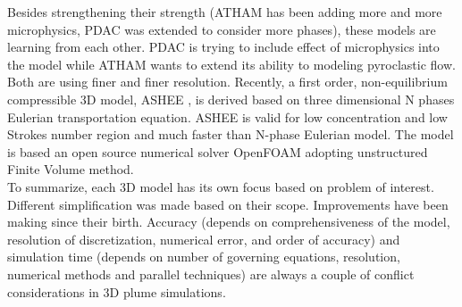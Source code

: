 \documentclass[journal abbreviation, manuscript]{copernicus}
\begin{document}
Besides strengthening their strength (ATHAM has been adding more and more microphysics, PDAC was extended to consider more phases), these models are learning from each other. PDAC is trying to include effect of microphysics into the model while ATHAM wants to extend its ability to modeling pyroclastic flow. Both are using finer and finer resolution. Recently, a first order, non-equilibrium compressible 3D model, ASHEE \citep{cerminara2016ashee}, is derived based on three dimensional N phases Eulerian transportation equation. ASHEE is valid for low concentration and low Strokes number region and much faster than N-phase Eulerian model. The model is based an open source numerical solver OpenFOAM adopting unstructured Finite Volume method.\\
To summarize, each 3D model has its own focus based on problem of interest. Different simplification was made based on their scope. Improvements have been making since their birth. Accuracy (depends on comprehensiveness of the model, resolution of discretization, numerical error, and order of accuracy) and simulation time (depends on number of governing equations, resolution, numerical methods and parallel techniques) are always a couple of conflict considerations in 3D plume simulations.\\
%
\end{document}

